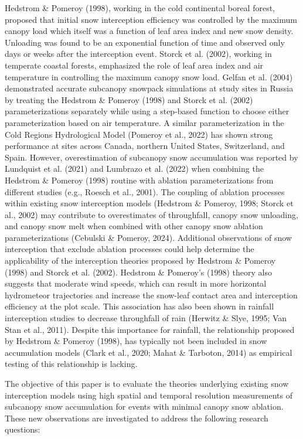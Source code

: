 \documentclass[
  letterpaper,
  DIV=11,
  numbers=noendperiod]{scrartcl}
\begin{document}
Hedstrom \& Pomeroy (1998), working in the cold continental boreal
forest, proposed that initial snow interception efficiency was
controlled by the maximum canopy load which itself was a function of
leaf area index and new snow density. Unloading was found to be an
exponential function of time and observed only days or weeks after the
interception event. Storck et al. (2002), working in temperate coastal
forests, emphasized the role of leaf area index and air temperature in
controlling the maximum canopy snow load. Gelfan et al. (2004)
demonstrated accurate subcanopy snowpack simulations at study sites in
Russia by treating the Hedstrom \& Pomeroy (1998) and Storck et al.
(2002) parameterizations separately while using a step-based function to
choose either parameterization based on air temperature. A similar
parameterization in the Cold Regions Hydrological Model (Pomeroy et al.,
2022) has shown strong performance at sites across Canada, northern
United States, Switzerland, and Spain. However, overestimation of
subcanopy snow accumulation was reported by Lundquist et al. (2021) and
Lumbrazo et al. (2022) when combining the Hedstrom \& Pomeroy (1998)
routine with ablation parameterizations from different studies (e.g.,
Roesch et al., 2001). The coupling of ablation processes within existing
snow interception models (Hedstrom \& Pomeroy, 1998; Storck et al.,
2002) may contribute to overestimates of throughfall, canopy snow
unloading, and canopy snow melt when combined with other canopy snow
ablation parameterizations (Cebulski \& Pomeroy, 2024). Additional
observations of snow interception that exclude ablation processes could
help determine the applicability of the interception theories proposed
by Hedstrom \& Pomeroy (1998) and Storck et al. (2002). Hedstrom \&
Pomeroy's (1998) theory also suggests that moderate wind speeds, which
can result in more horizontal hydrometeor trajectories and increase the
snow-leaf contact area and interception efficiency at the plot scale.
This association has also been shown in rainfall interception studies to
decrease throughfall of rain (Herwitz \& Slye, 1995; Van Stan et al.,
2011). Despite this importance for rainfall, the relationship proposed
by Hedstrom \& Pomeroy (1998), has typically not been included in snow
accumulation models (Clark et al., 2020; Mahat \& Tarboton, 2014) as
empirical testing of this relationship is lacking.

The objective of this paper is to evaluate the theories underlying
existing snow interception models using high spatial and temporal
resolution measurements of subcanopy snow accumulation for events with
minimal canopy snow ablation. These new observations are investigated to
address the following research questions:
\end{document}
